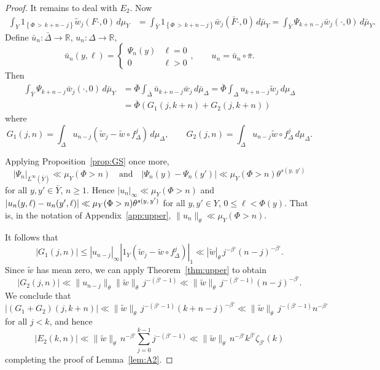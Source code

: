 \documentclass[10pt]{amsart}
\theoremstyle{definition}\newtheorem{defi}[theo]{Definition}\newtheorem{rema}[theo]{Remark}\newtheorem{exam}[theo]{Example}\newtheorem{exem}[theo]{Example}\newtheorem{nota}[theo]{Notation}
\newcommand{\R}{\mathbb{R}}
\newcommand{\tw}{\widetilde{w}}
\newcommand{\bY}{\bar{Y}}
\newcommand{\bDelta}{\bar{\Delta}}
\newcommand{\bPhi}{\bar{\Phi}}
\newcommand{\bF}{\bar{F}}
\begin{document}
\begin{proof}
It remains to deal with $E_2$. Now
\begin{align*}
\int_Y1_{\left\{\Phi\,>\,k+n-j\right\}}\tw_j(F\cdot,0) \,d\mu_Y & =
\int_{\bY} 1_{\left\{\Phi\,>\,k+n-j\right\}}\bar{w}_j(\bF\cdot,0) \,d\bar\mu_Y =\int_{\bY} \Psi_{k+n-j} \bar w_j(\cdot,0) \,d\bar\mu_Y.
\end{align*}
Define $\bar u_n:\bDelta\to\R$, $u_n:\Delta\to\R$,
\[
\bar u_n(y,\ell)=
\begin{cases}
\Psi_n(y) & \ell=0
\\ 0 & \ell>0
\end{cases}, \qquad u_n=\bar u_n\circ\bar\pi.
\]
Then
\begin{align*}
\int_{\bY} \Psi_{k+n-j}\bar w_j(\cdot,0) \,d\bar\mu_Y & =
\bPhi\int_{\bDelta} \bar u_{k+n-j} \bar w_j \,d\bar\mu_\Delta =
\bPhi\int_\Delta u_{k+n-j} \tw_j \,d\mu_\Delta
\\ & =\bPhi\left(G_1(j,k+n)+G_2(j,k+n)\right)
\end{align*}
where
\[
G_1(j,n)=\int_\Delta u_{n-j} \left(\tw_j-\tw\circ f_\Delta^j\right) \,d\mu_\Delta, \qquad G_2(j,n)=\int_\Delta u_{n-j} \tw\circ f_\Delta^j \,d\mu_\Delta.
\]

Applying Proposition~\ref{prop:GS} once more,
\[
\left|\Psi_n\right|_{L^\infty(\bY)} \ll \mu_Y(\Phi>n)
\quad\text{and}\quad \left|\Psi_n(y)- \Psi_n(y')\right| \ll \mu_Y(\Phi>n) \theta^{s(y,\,y')}
\]
for all $y,y'\in \bY$, $n\ge1$. Hence $|u_n|_\infty \ll \mu_Y(\Phi>n)$ and $|u_n(y,\ell)-u_n(y',\ell)|\linebreak\ll \mu_Y(\Phi>n) \theta^{s(y,\,y')}$ for all $y,y'\in Y$, $0\le \ell<\Phi(y)$. That is, in the notation of Appendix~\ref{app:upper}, $\|u_n\|_\theta\ll \mu_Y(\Phi>n)$.

It follows that
\[
|G_1(j,n)|\le |u_{n-j}|_\infty|1_Y\left(\tw_j-\tw\circ f_\Delta^j\right)|_1
\ll |\tw|_\theta\,j^{-\beta'}(n-j)^{-\beta'}.
\]
Since $\tw$ has mean zero, we can apply Theorem~\ref{thm:upper} to obtain
\[
\left|G_2(j,n)\right| \ll \|u_{n-j}\|_\theta \|\tw\|_\theta\, j^{-(\beta'-1)}
\ll \|\tw\|_\theta\,j^{-(\beta'-1)}(n-j)^{-\beta'}.
\]
We conclude that
\[
\left|(G_1+G_2)(j,k+n)\right|
\ll \|\tw\|_\theta\, j^{-(\beta'-1)}(k+n-j)^{-\beta'}
\ll \|\tw\|_\theta\, j^{-(\beta'-1)}n^{-\beta'}
\]
for all $j<k$, and hence
\[
\left|E_2(k,n)\right|\ll \|\tw\|_\theta\,n^{-\beta'}\sum_{j=0}^{k-1}j^{-(\beta'-1)}
\ll \|\tw\|_\theta \, n^{-\beta'}k^{\beta'}\zeta_{\beta'}(k)
\]
completing the proof of Lemma~\ref{lem:A2}.
\end{proof}
\end{document}
